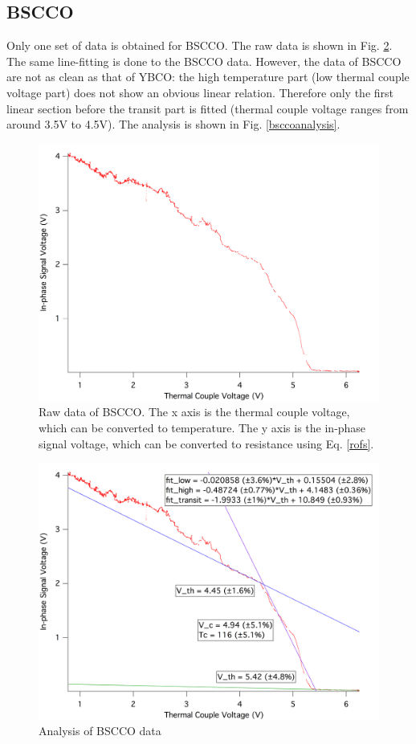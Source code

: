 \documentclass[prb,preprint]{revtex4-1}
\begin{document}
\subsection{BSCCO}
Only one set of data is obtained for BSCCO. The raw data is shown in Fig. \ref{bsccoraw}. The same line-fitting is done to the BSCCO data. However, the data of BSCCO are not as clean as that of YBCO: the high temperature part (low thermal couple voltage part) does not show an obvious linear relation. Therefore only the first linear section before the transit part is fitted (thermal couple voltage ranges from around 3.5V to 4.5V). The analysis is shown in Fig. \ref{bsccoanalysis}.\\

\begin{figure}[h]
\centering
\includegraphics[width=14cm]{bscco_heating_raw.png}
\caption{Raw data of BSCCO. The x axis is the thermal couple voltage, which can be converted to temperature. The y axis is the in-phase signal voltage, which can be converted to resistance using Eq. \ref{rofs}.}
\label{bsccoraw}
\end{figure}

\begin{figure}[h]
\centering
\includegraphics[width=14cm]{bscco_heating.png}
\caption{Analysis of BSCCO data}
\label{bsccoraw}
\end{figure}
\end{document}

